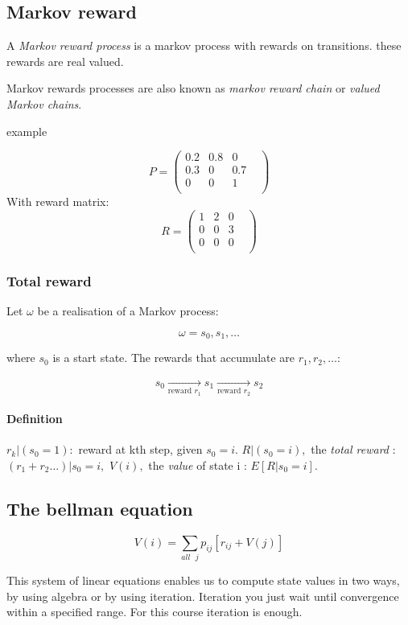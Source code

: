 \documentclass{article}
\begin{document}
\subsection{Markov reward}
A \emph{Markov reward process} is a markov process with rewards on
transitions. these rewards are real valued.

Markov rewards processes are also known as \emph{markov reward chain} or
\emph{valued Markov chains}.

example

\[
	P =
\begin{pmatrix}
	0.2	& 0.8 & 0 	& \\
	0.3	& 0	& 0.7	& \\
	0	& 0 & 1	& \\
\end{pmatrix}
\]
With reward matrix:
\[
	R =
\begin{pmatrix}
	1	& 2 & 0 	& \\
	0	& 0	& 3	& \\
	0	& 0 & 0	& \\
\end{pmatrix}
\]

\subsubsection{Total reward}

Let $\omega$ be a realisation of a Markov process:

\[\omega = s_0, s_1, \dots\]

where $s_0$ is a start state.
The rewards that accumulate are $r_1, r_2, \dots$:

\[ s_0 \xrightarrow[\mbox{reward } r_1]{} s_1 \xrightarrow[\mbox{reward } r_2]{} s_2\]

\paragraph{Definition}

$r_k | (s_0=1) : $ reward at kth step, given $s_0 = i$.
$R|(s_0=i),$ the \emph{total reward} : $(r_1 + r_2 \dots)|s_0=i,$
$V(i),$ the \emph{value} of state i : $E[R|s_0=i]$.

\subsection{The bellman equation}

\[V(i)=\sum_{all\mbox{\ }j} p_{ij}[r_{ij} + V(j)]\]

This system of linear equations enables us to compute state values in two
ways, by using algebra or by using iteration. Iteration you just wait until
convergence within a specified range. For this course iteration is enough.
\end{document}
